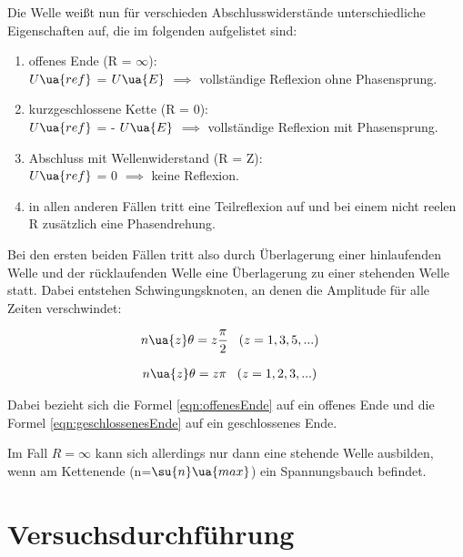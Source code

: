 Die Welle weißt nun für verschieden Abschlusswiderstände unterschiedliche
Eigenschaften auf, die im folgenden aufgelistet sind:


\renewcommand{\labelenumi}{\alph{enumi})}
\begin{enumerate}
  \item offenes Ende (R = $\infty$): \\
        $U\ua{ref}$ = $U\ua{E}$ $\implies$ vollständige Reflexion ohne Phasensprung.

  \item kurzgeschlossene Kette (R = 0): \\
        $U\ua{ref}$ = - $U\ua{E}$ $\implies$ vollständige Reflexion mit Phasensprung.

  \item Abschluss mit Wellenwiderstand (R = Z): \\
        $U\ua{ref}$ = 0 $\implies$ keine Reflexion.

  \item in allen anderen Fällen tritt eine Teilreflexion auf und bei einem nicht
        reelen R zusätzlich eine Phasendrehung.
\end{enumerate}

Bei den ersten beiden Fällen tritt also durch Überlagerung einer hinlaufenden
Welle und der rücklaufenden Welle eine Überlagerung zu einer stehenden Welle
statt. Dabei entstehen Schwingungsknoten, an denen die Amplitude für alle
Zeiten verschwindet:

\begin{align}
  n\ua{z}\theta &= z \frac{\pi}{2} \, \, \, \, \, (z = 1,3,5, ...)
  \label{eqn:offenesEnde}
\end{align}

\begin{align}
  n\ua{z}\theta &= z \pi \, \, \, \, \, (z = 1,2,3, ...)
  \label{eqn:geschlossenesEnde}
\end{align}

Dabei bezieht sich die Formel \eqref{eqn:offenesEnde} auf ein offenes Ende und
die Formel \eqref{eqn:geschlossenesEnde} auf ein geschlossenes Ende.

Im Fall $R = \infty$ kann sich allerdings nur dann eine stehende Welle ausbilden,
wenn am Kettenende (n=$\su{n}\ua{max}$) ein Spannungsbauch befindet.

\newpage

\section{Versuchsdurchführung}

